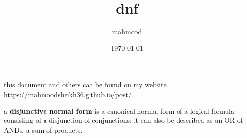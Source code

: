 \documentclass[a4paper,12pt]{article}
\author{mahmood}
\date{\today}
\title{dnf}
\begin{document}
\maketitle
\begin{note}
this document and others can be found on my website\\
\url{https://mahmoodsheikh36.github.io/post/}
\end{note}
\begin{definition}
a \textbf{disjunctive normal form} is a canonical normal form of a logical formula consisting of a disjunction of conjunctions; it can also be described as an OR of ANDs, a sum of products.\\
\end{definition}
\end{document}
